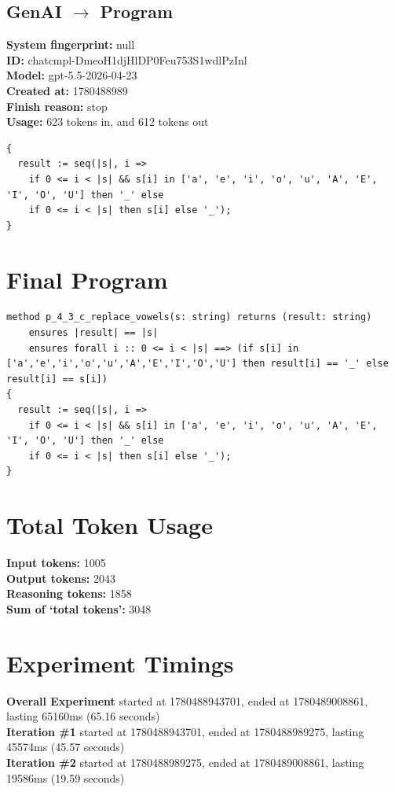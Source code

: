 \documentclass{article}
\begin{document}
\subsection*{GenAI $\rightarrow$ Program}
\textbf{System fingerprint: }null
\\\textbf{ID: }chatcmpl-DmeoH1djHlDP0Feu753S1wdlPzInl
\\\textbf{Model: }gpt-5.5-2026-04-23
\\\textbf{Created at: }1780488989
\\\textbf{Finish reason: }stop
\\\textbf{Usage: }623 tokens in, and 612 tokens out
\begin{lstlisting}
{
  result := seq(|s|, i =>
    if 0 <= i < |s| && s[i] in ['a', 'e', 'i', 'o', 'u', 'A', 'E', 'I', 'O', 'U'] then '_' else
    if 0 <= i < |s| then s[i] else '_');
}
\end{lstlisting}
\section*{Final Program}
\begin{lstlisting}
method p_4_3_c_replace_vowels(s: string) returns (result: string)
	ensures |result| == |s|
	ensures forall i :: 0 <= i < |s| ==> (if s[i] in ['a','e','i','o','u','A','E','I','O','U'] then result[i] == '_' else result[i] == s[i])
{
  result := seq(|s|, i =>
    if 0 <= i < |s| && s[i] in ['a', 'e', 'i', 'o', 'u', 'A', 'E', 'I', 'O', 'U'] then '_' else
    if 0 <= i < |s| then s[i] else '_');
}
\end{lstlisting}
\section*{Total Token Usage}
\textbf{Input tokens: }1005
\\\textbf{Output tokens: }2043
\\\textbf{Reasoning tokens: }1858
\\\textbf{Sum of `total tokens': }3048
\section*{Experiment Timings}
\textbf{Overall Experiment} started at 1780488943701, ended at 1780489008861, lasting 65160ms (65.16 seconds)
\\\textbf{Iteration \#1} started at 1780488943701, ended at 1780488989275, lasting 45574ms (45.57 seconds)
\\\textbf{Iteration \#2} started at 1780488989275, ended at 1780489008861, lasting 19586ms (19.59 seconds)
\end{document}
